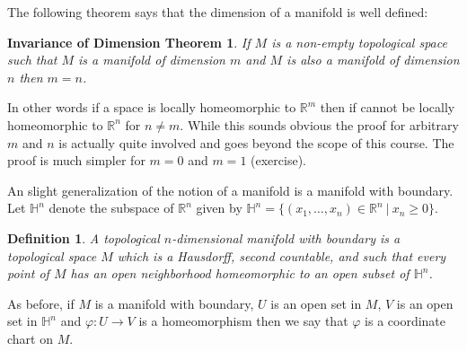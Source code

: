 \documentclass[11pt, letterpaper, oneside]{report}
\theoremstyle{pplain}
\newtheorem{ITERMVALUE THM}[theorem]{Intermediate Value Theorem}
\newtheorem{HEINEBOREL THM}[theorem]{Heine-Borel Theorem}
\newtheorem{UMETR THM}[theorem]{Urysohn Metrization Theorem}
\newtheorem{UMETR2 THM}[theorem]{Urysohn Metrization Theorem (v.2)}
\newtheorem{INVDIMTHM}[theorem]{Invariance of Dimension Theorem}
\theoremstyle{ddefinition}
\newtheorem{definition}[theorem]{Definition}
\theoremstyle{nnn}
\newtheorem{TDA NN}[theorem]{Topological Data Analysis. }
\theoremstyle{eexercise}
\newcommand{\R}{{\mathbb R}}
\newcommand{\HH}{{\mathbb H}}
\begin{document}
The following theorem says that the dimension of a manifold is well defined:

\begin{INVDIMTHM}
\label{INVDIM THM}
If $M$ is a non-empty topological space such that $M$ is a manifold of dimension $m$ and 
$M$ is also a manifold of dimension $n$ then $m=n$.
\end{INVDIMTHM}

In other words if a space is locally homeomorphic to $\R^{m}$ then if cannot be locally homeomorphic 
to $\R^{n}$ for  $n\neq m$. While this sounds obvious the proof for arbitrary $m$ and $n$ is actually 
quite involved and goes beyond the scope of this course. The proof is much simpler for $m=0$ and $m=1$  (exercise).

An slight generalization of the notion of a manifold is a manifold with boundary. 
Let $\HH^{n}$ denote the subspace of $\R^{n}$ given by 
$\HH^{n} = \{(x_{1}, \dots, x_{n})\in \R^{n} \ | \ x_{n} \geq 0 \}$. 

\begin{definition}
\label{MANIFOLD WITH BOUNDARY DEF}
A \emph{topological $n$-dimensional manifold with boundary} is a topological space $M$
which is a Hausdorff, second countable, and such that
every point of $M$ has an open neighborhood  homeomorphic to an 
open subset of $\HH^{n}$. 
\end{definition}

As before, if $M$ is a manifold with boundary, $U$ is an open set in $M$, $V$ is an open set in $\HH^{n}$
and $\varphi\colon U\to V$ is a homeomorphism then we say that $\varphi$ is a coordinate chart on $M$. 
\end{document}
